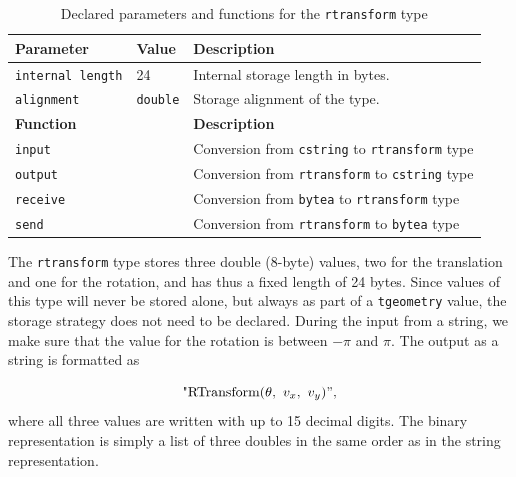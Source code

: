\begin{table}[htb]
    \centering
    \begin{tabularx}{\textwidth}{|l|l|X|}
    \hline
    \textbf{Parameter}  & \textbf{Value}        & \textbf{Description} \\ 
    \hline
    \lstinline+internal length+     & 24                    & Internal storage length in bytes. \\
    \hline
    \lstinline+alignment+           & \lstinline+double+                & Storage alignment of the type. \\
    \hline
    \multicolumn{2}{|l|}{\textbf{Function}}     & \textbf{Description} \\ 
    \hline
    \multicolumn{2}{|l|}{\lstinline+input+}     & Conversion from \lstinline{cstring} to \lstinline{rtransform} type \\
    \hline
    \multicolumn{2}{|l|}{\lstinline+output+}    & Conversion from \lstinline{rtransform} to \lstinline{cstring} type \\
    \hline
    \multicolumn{2}{|l|}{\lstinline+receive+}               & Conversion from \lstinline{bytea} to \lstinline{rtransform} type \\
    \hline
    \multicolumn{2}{|l|}{\lstinline+send+}                  & Conversion from \lstinline{rtransform} to \lstinline{bytea} type \\
    \hline
    \end{tabularx}
    \caption{Declared parameters and functions for the \lstinline{rtransform} type}
    \label{table:rtransform_type_declaration}
\end{table}

The \lstinline+rtransform+ type stores three double (8-byte) values, two for the translation and one for the rotation, and has thus a fixed length of 24 bytes. Since values of this type will never be stored alone, but always as part of a \lstinline+tgeometry+ value, the storage strategy does not need to be declared. During the input from a string, we make sure that the value for the rotation is between $-\pi$ and $\pi$. The output as a string is formatted as

\[
    \text{"RTransform(}\theta,\ v_x,\ v_y{)"}, 
\]
where all three values are written with up to 15 decimal digits. The binary representation is simply a list of three doubles in the same order as in the string representation.

